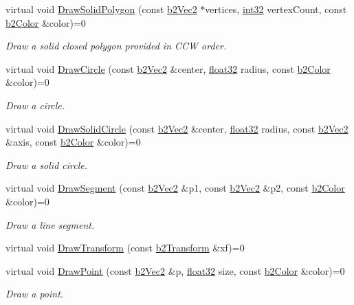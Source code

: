 \begin{DoxyCompactItemize}
virtual void \mbox{\hyperlink{classb2_draw_a76f2d67de0781a32cab116278c5c9eea}{Draw\+Solid\+Polygon}} (const \mbox{\hyperlink{structb2_vec2}{b2\+Vec2}} $\ast$vertices, \mbox{\hyperlink{b2_settings_8h_a43d43196463bde49cb067f5c20ab8481}{int32}} vertex\+Count, const \mbox{\hyperlink{structb2_color}{b2\+Color}} \&color)=0
\begin{DoxyCompactList}\small\item\em Draw a solid closed polygon provided in C\+CW order. \end{DoxyCompactList}\item 
virtual void \mbox{\hyperlink{classb2_draw_ae2effe9bca87c8d7cb90e860d13b7e9e}{Draw\+Circle}} (const \mbox{\hyperlink{structb2_vec2}{b2\+Vec2}} \&center, \mbox{\hyperlink{b2_settings_8h_aacdc525d6f7bddb3ae95d5c311bd06a1}{float32}} radius, const \mbox{\hyperlink{structb2_color}{b2\+Color}} \&color)=0
\begin{DoxyCompactList}\small\item\em Draw a circle. \end{DoxyCompactList}\item 
virtual void \mbox{\hyperlink{classb2_draw_a775a1d0472c5980d597904c7b596a0a6}{Draw\+Solid\+Circle}} (const \mbox{\hyperlink{structb2_vec2}{b2\+Vec2}} \&center, \mbox{\hyperlink{b2_settings_8h_aacdc525d6f7bddb3ae95d5c311bd06a1}{float32}} radius, const \mbox{\hyperlink{structb2_vec2}{b2\+Vec2}} \&axis, const \mbox{\hyperlink{structb2_color}{b2\+Color}} \&color)=0
\begin{DoxyCompactList}\small\item\em Draw a solid circle. \end{DoxyCompactList}\item 
virtual void \mbox{\hyperlink{classb2_draw_a1de5aaf50db875d1c644c596832af57d}{Draw\+Segment}} (const \mbox{\hyperlink{structb2_vec2}{b2\+Vec2}} \&p1, const \mbox{\hyperlink{structb2_vec2}{b2\+Vec2}} \&p2, const \mbox{\hyperlink{structb2_color}{b2\+Color}} \&color)=0
\begin{DoxyCompactList}\small\item\em Draw a line segment. \end{DoxyCompactList}\item 
virtual void \mbox{\hyperlink{classb2_draw_ade698123482a491a7a61fa1fe4d3a4f4}{Draw\+Transform}} (const \mbox{\hyperlink{structb2_transform}{b2\+Transform}} \&xf)=0
\item 
virtual void \mbox{\hyperlink{classb2_draw_acc83934a18c276d4391296c4968d9e16}{Draw\+Point}} (const \mbox{\hyperlink{structb2_vec2}{b2\+Vec2}} \&p, \mbox{\hyperlink{b2_settings_8h_aacdc525d6f7bddb3ae95d5c311bd06a1}{float32}} size, const \mbox{\hyperlink{structb2_color}{b2\+Color}} \&color)=0
\begin{DoxyCompactList}\small\item\em Draw a point. \end{DoxyCompactList}\end{DoxyCompactItemize}

